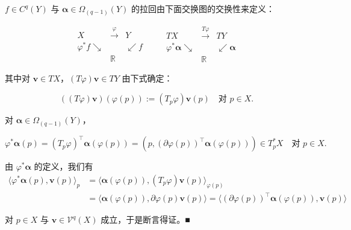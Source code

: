 \begin{remark}

\begin{items}
\item

$ f \in C^{q}(Y) $ 与 $ \boldsymbol{\alpha} \in \Omega_{(q-1)}(Y) $ 的拉回由下面交换图的交换性来定义：

\begin{equation*}
\begin{array}{ccc} X & \xrightarrow{\varphi} & Y \\ \varphi^{*}f \searrow & & \swarrow f \\ & \mathbb{R} & \end{array} \qquad \begin{array}{ccc} TX & \xrightarrow{T\varphi} & TY \\ \varphi^{*}\boldsymbol{\alpha} \searrow & & \swarrow \boldsymbol{\alpha} \\ & \mathbb{R} & \end{array}
\end{equation*}

其中对 $ \boldsymbol{v} \in TX $，$ (T\varphi)\boldsymbol{v} \in TY $ 由下式确定：

\[
((T\varphi)\boldsymbol{v})(\varphi(p)) := (T_{p}\varphi)\boldsymbol{v}(p) \quad \text{对 } p \in X .
\]
\item

对 $ \boldsymbol{\alpha} \in \Omega_{(q-1)}(Y) $，

\[
\varphi^{*}\boldsymbol{\alpha}(p) = (T_{p}\varphi)^{\top}\boldsymbol{\alpha}(\varphi(p)) = \left( p,(\partial\varphi(p))^{\top}\boldsymbol{\alpha}(\varphi(p)) \right) \in T_{p}^{*}X \quad \text{对 } p \in X .
\]

\proofhead
由 $ \varphi^{*}\boldsymbol{\alpha} $ 的定义，我们有
\begin{equation*}
\begin{aligned}
\langle\varphi^{*}\boldsymbol{\alpha}(p),\boldsymbol{v}(p)\rangle_{p} &= \langle\boldsymbol{\alpha}(\varphi(p)),(T_{p}\varphi)\boldsymbol{v}(p)\rangle_{\varphi(p)} \\ &= \langle\boldsymbol{\alpha}(\varphi(p)),\partial\varphi(p)\boldsymbol{v}(p)\rangle = \langle(\partial\varphi(p))^{\top}\boldsymbol{\alpha}(\varphi(p)),\boldsymbol{v}(p)\rangle
\end{aligned}
\end{equation*}

对 $ p \in X $ 与 $ \boldsymbol{v} \in \mathcal{V}^{q}(X) $ 成立，于是断言得证。\nobreak\hspace{0.35em}■


\end{items}
\end{remark}
